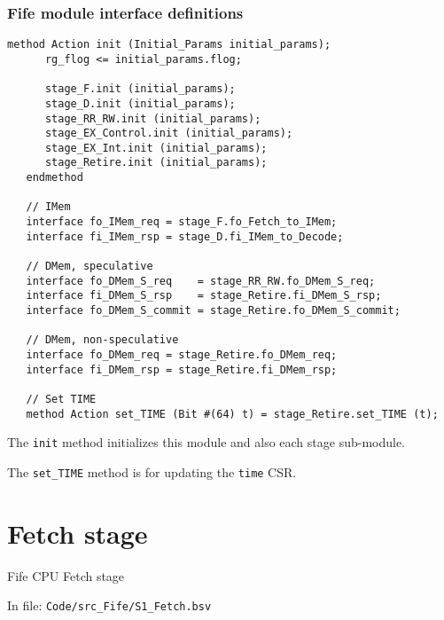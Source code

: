 
\begin{frame}[fragile]
\frametitle{Fife module interface definitions}

\footnotesize

\begin{minipage}{0.75\textwidth}\scriptsize
\begin{Verbatim}[frame=single, label=From src\_Fife/CPU.bsv]
   method Action init (Initial_Params initial_params);
      rg_flog <= initial_params.flog;

      stage_F.init (initial_params);
      stage_D.init (initial_params);
      stage_RR_RW.init (initial_params);
      stage_EX_Control.init (initial_params);
      stage_EX_Int.init (initial_params);
      stage_Retire.init (initial_params);
   endmethod

   // IMem
   interface fo_IMem_req = stage_F.fo_Fetch_to_IMem;
   interface fi_IMem_rsp = stage_D.fi_IMem_to_Decode;

   // DMem, speculative
   interface fo_DMem_S_req    = stage_RR_RW.fo_DMem_S_req;
   interface fi_DMem_S_rsp    = stage_Retire.fi_DMem_S_rsp;
   interface fo_DMem_S_commit = stage_Retire.fo_DMem_S_commit;

   // DMem, non-speculative
   interface fo_DMem_req = stage_Retire.fo_DMem_req;
   interface fi_DMem_rsp = stage_Retire.fi_DMem_rsp;

   // Set TIME
   method Action set_TIME (Bit #(64) t) = stage_Retire.set_TIME (t);
\end{Verbatim}
\end{minipage}
\hm
\begin{minipage}{0.22\textwidth}
The {\tt init} method initializes this module and also each stage sub-module.

\vspace{2ex}

The {\tt set\_TIME} method is for updating the {\tt time} CSR.
\end{minipage}

\end{frame}


\section{Fetch stage}

\begin{frame}[fragile]

\begin{center}
  {\LARGE Fife CPU Fetch stage}

  \vspace{10ex}

  In file: \verb|Code/src_Fife/S1_Fetch.bsv|
\end{center}

\end{frame}

